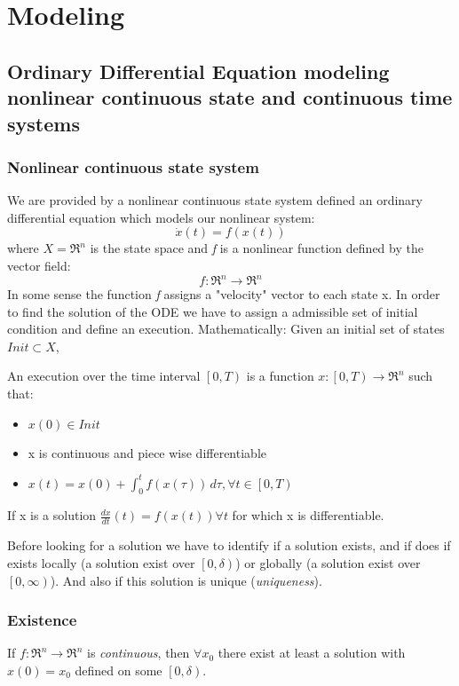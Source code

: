 \chapter{Modeling}
\section{Ordinary Differential Equation modeling nonlinear continuous state and continuous time systems}
\subsection{Nonlinear continuous state system}
We are provided by a nonlinear continuous state system defined an ordinary differential equation which models our nonlinear system:
\[
\dot{x}(t)=f(x(t))
\]
where $X=\Re^n$ is the state space and \emph{f} is a nonlinear function defined by the vector field:
\[
f\colon\Re^n\to\Re^n
\]
In some sense the function \emph{f} assigns a "velocity" vector to each state x.
In order to find the solution of the ODE we have to assign a admissible set of initial condition and define an execution. Mathematically:
Given an initial set of states $Init \subset X$,

An execution over the time interval $\left[0,T\right)$ is a function $x\colon\left[ 0,T\right)\to \Re^n$ such that:
\begin{itemize}
	\item $x(0)\in Init$
	\item x is continuous and piece wise differentiable
	\item $x(t)=x(0)+ \int_0^t f(x(\tau))\,d\tau , \forall t \in \left[0,T\right)$
\end{itemize}

If x is a solution $\frac{dx}{dt}(t)=f(x(t)) \forall t$ for which x is differentiable.

Before looking for a solution we have to identify if a solution exists, and if does if exists locally (a solution exist over $\left[0,\delta\right)$) or globally (a solution exist over $\left[0,\infty\right)$). And also if this solution is unique (\emph{uniqueness}).

\subsection{Existence} 
\begin{thm}
	
	If $ f\colon\Re^n\to\Re^n$ is \emph{continuous}, then $\forall x_0$ there exist at least a solution with $x(0)=x_0$ defined on some $\left[0,\delta\right)$.
\end{thm}
